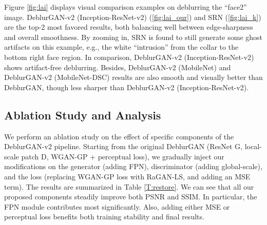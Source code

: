 \documentclass[10pt,twocolumn,letterpaper]{article}
\begin{document}
Figure \ref{fig:lai} displays visual comparison examples on deblurring the ``face2'' image. DeblurGAN-v2 (Inception-ResNet-v2) (\ref{fig:lai_our}) and SRN (\ref{fig:lai_k}) are the top-2 most favored results, both balancing well between edge-sharpness and overall smoothness. By zooming in, SRN is found to still generate some ghost artifacts on this example, e.g., the white ``intrusion'' from the collar to the bottom right face region. In comparison, DeblurGAN-v2 (Inception-ResNet-v2) shows artifact-free deblurring. Besides, DeblurGAN-v2 (MobileNet) and DeblurGAN-v2 (MobileNet-DSC) results are also smooth and visually better than DeblurGAN, though less sharper than DeblurGAN-v2 (Inception-ResNet-v2). 





\subsection{Ablation Study and Analysis}
\vspace{-0.5em}
We perform an ablation study on the effect of specific components of the DeblurGAN-v2 pipeline. Starting from the original DeblurGAN (ResNet G, local-scale patch D, WGAN-GP + perceptual loss), we gradually inject our modifications on the generator (adding FPN), discriminator (adding global-scale), and the loss (replacing WGAN-GP loss with RaGAN-LS, and adding an MSE term). The results are summarized in Table \ref{T:restore}. We can see that all our proposed components steadily improve both PSNR and SSIM. In particular, the FPN module contributes most significantly. Also, adding either MSE or perceptual loss benefits both training stability and final results. 
\end{document}
